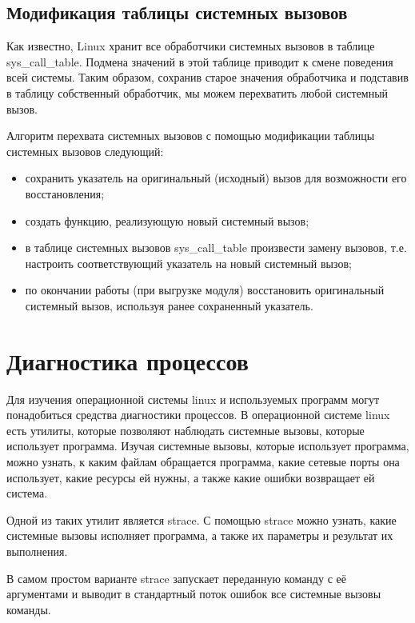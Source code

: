 \subsection{Модификация таблицы системных вызовов}%
\label{sub:modifikatsiia_tablitsy_sistemnykh_vyzovov}

Как известно, Linux хранит все обработчики системных вызовов в таблице sys\_call\_table. Подмена значений в этой таблице приводит к смене поведения всей системы. Таким образом, сохранив старое значения обработчика и подставив в таблицу собственный обработчик, мы можем перехватить любой системный вызов.

Алгоритм перехвата системных вызовов с помощью модификации таблицы системных вызовов следующий:
\begin{itemize}
    \item
        сохранить указатель на оригинальный (исходный) вызов для возможности его восстановления;
    \item
    создать функцию, реализующую новый системный вызов;
    \item
    в таблице системных вызовов sys\_call\_table произвести замену вызовов, т.е. настроить соответствующий указатель на новый системный вызов;
    \item
    по окончании работы (при выгрузке модуля) восстановить оригинальный системный вызов, используя ранее сохраненный указатель.
\end{itemize}

\section{Диагностика процессов}%
\label{sec:diagnostika_protsessov}

Для изучения операционной системы linux и используемых программ могут понадобиться средства диагностики процессов. В операционной системе linux есть утилиты, которые позволяют наблюдать системные вызовы, которые использует программа. Изучая системные вызовы, которые использует программа, можно узнать, к каким файлам обращается программа, какие сетевые порты она использует, какие ресурсы ей нужны, а также какие ошибки возвращает ей система.

Одной из таких утилит является strace. С помощью strace можно узнать, какие системные вызовы исполняет программа, а также их параметры и результат их выполнения.

В самом простом варианте strace запускает переданную команду с её аргументами и выводит в стандартный поток ошибок все системные вызовы команды.

